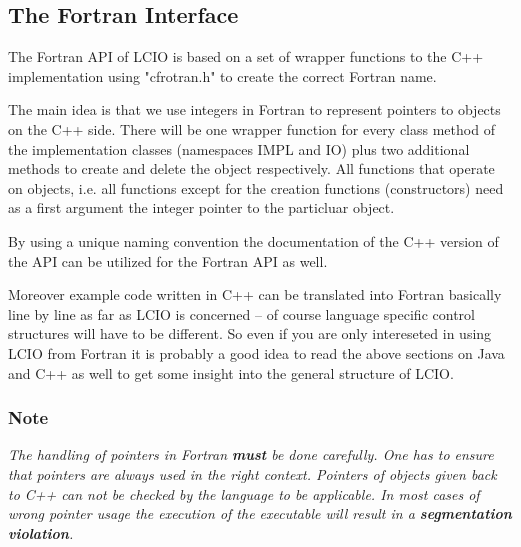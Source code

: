 %
%
\subsection{The Fortran Interface} \label{f77api}

The Fortran API of LCIO is based on a set of wrapper functions to the 
C++ implementation using "cfrotran.h" to create the correct Fortran name.

The main idea is that we use integers in Fortran to represent pointers to 
objects on the C++ side. There will be one wrapper function for every class method
of the implementation classes (namespaces IMPL and IO) plus two additional methods 
to create and delete the object respectively. All functions that operate on objects, i.e.
all functions except for the creation functions (constructors) need as a first argument 
the integer pointer to the particluar object.

By using a unique naming convention the documentation of the C++ version of the API
can be utilized for the Fortran API as well.

Moreover example code written in C++ can be translated into Fortran basically line by 
line as far as LCIO is concerned -- of course language specific control structures 
will have to be different. So even if you are only intereseted in using LCIO from Fortran 
it is probably a good idea to read the above sections on Java and C++ as well to get some 
insight into the general structure of LCIO.


\subsubsection{ Note} \label{f77note}
{\em The handling of pointers in Fortran {\bf\em must} be done carefully.
One has to ensure that pointers are always used in the right context.
Pointers of objects given back to C++ can not be checked by the language to be applicable.
In most cases of wrong pointer usage the execution of the executable will result in a
{\bf\em{ segmentation violation}}.
}



